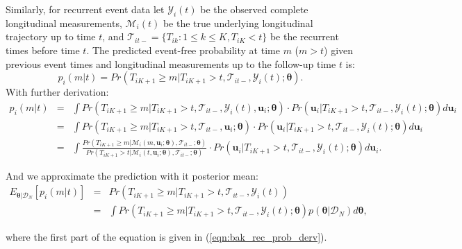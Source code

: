 Similarly, for recurrent event data let $\mathcal{Y}_{i}(t)$ be the observed complete longitudinal measurements,  $\mathcal{M}_{i}(t)$ be the true underlying longitudinal trajectory up to time $t$, and $\mathcal{T}_{it-}=\{T_{ik}: 1\le k\le K, T_{iK} < t\}$ be the recurrent times before time $t$. The predicted event-free probability at time $m$ ($m > t$) given previous event times and longitudinal measurements up to the follow-up time $t$ is:
\[p_i(m|t) = Pr(T_{iK+1}\ge m | T_{iK+1}> t, \mathcal{T}_{it-}, \mathcal{Y}_{i}(t); \boldsymbol{\theta}).\]
With further derivation:
{\small
\begin{eqnarray}
\label{eqn:bak_rec_prob_derv}
\nonumber p_i(m|t) &=& \int Pr(T_{iK+1}\ge m | T_{iK+1}> t, \mathcal{T}_{it-}, \mathcal{Y}_{i}(t), \boldsymbol{u}_i; \boldsymbol{\theta}) \cdot Pr(\boldsymbol{u}_i|T_{iK+1}> t, \mathcal{T}_{it-}, \mathcal{Y}_{i}(t);\boldsymbol{\theta})d\boldsymbol{u}_i\\
\nonumber&=& \int Pr(T_{iK+1}\ge m | T_{iK+1}> t, \mathcal{T}_{it-}, \boldsymbol{u}_i; \boldsymbol{\theta}) \cdot Pr(\boldsymbol{u}_i|T_{iK+1}> t, \mathcal{T}_{it-}, \mathcal{Y}_{i}(t);\boldsymbol{\theta})d\boldsymbol{u}_i\\
&=&\int \frac{Pr(T_{iK+1}\ge m | \mathcal{M}_{i}(m, \boldsymbol{u}_i; \boldsymbol{\theta}), \mathcal{T}_{it-}; \boldsymbol{\theta})}{Pr(T_{iK+1}> t | \mathcal{M}_{i}(t, \boldsymbol{u}_i; \boldsymbol{\theta}), \mathcal{T}_{it-}; \boldsymbol{\theta})}\cdot Pr(\boldsymbol{u}_i|T_{iK+1}> t, \mathcal{T}_{it-}, \mathcal{Y}_{i}(t);\boldsymbol{\theta})d\boldsymbol{u}_i.
\end{eqnarray}
}


And we approximate the prediction with it posterior mean:
\begin{eqnarray}\label{eqn:bak_pexpct_pred}
\nonumber E_{\boldsymbol{\theta}|\mathcal{D}_N}[p_i(m|t)]&=&Pr(T_{iK+1}\ge m | T_{iK+1}> t, \mathcal{T}_{it-}, \mathcal{Y}_{i}(t))\\
\nonumber &=&\int Pr(T_{iK+1}\ge m | T_{iK+1}> t, \mathcal{T}_{it-}, \mathcal{Y}_{i}(t); \boldsymbol{\theta})p(\boldsymbol{\theta}|\mathcal{D}_N)d\boldsymbol{\theta},
\end{eqnarray}

\noindent where the first part of the equation is given in (\ref{eqn:bak_rec_prob_derv}).

